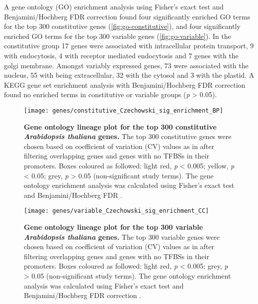 \documentclass[../main.tex]{subfiles}
\begin{document}
A gene ontology (GO) enrichment analysis using Fisher's exact test \autocite{fisherInterpretationContingencyTables1922} and Benjamini/Hochberg FDR correction \autocite{benjaminiControllingFalseDiscovery1995} found four significantly enriched GO terms for the top 300 constitutive genes (\autoref{fig:go-constitutive}), and four significantly enriched GO terms for the top 300 variable genes (\autoref{fig:go-variable}).
In the constitutive group 17 genes were associated with intracellular protein transport, 9 with endocytosis, 4 with receptor mediated endocytosis and 7 genes with the golgi membrane.
Amongst variably expressed genes, 73 were associated with the nucleus, 55 with being extracellular, 32 with the cytosol and 3 with the plastid.
A KEGG gene set enrichment analysis with Benjamini/Hochberg FDR correction found no enriched terms in constitutive or variable groups (\textit{p} \textgreater{} 0.05).

\begin{figure}[hbt!]
	\begin{center}
		\capstart
		\texttt{[image: genes/constitutive\_Czechowski\_sig\_enrichment\_BP]}
		\caption{
			\textbf{Gene ontology lineage plot for the top 300 constitutive \textit{Arabidopsis thaliana} genes.}
			The top 300 constitutive genes were chosen based on coefficient of variation (CV) values as in \textcite{czechowskiGenomeWideIdentificationTesting2005} after filtering overlapping genes and genes with no TFBSs in their promoters.
			Boxes coloured as followed: light red, \textit{p} \textless{} 0.005; yellow, \textit{p} \textless{} 0.05; grey, \textit{p} \textgreater{} 0.05 (non-significant study terms).
			The gene ontology enrichment analysis was calculated using Fisher's exact test \autocite{fisherInterpretationContingencyTables1922} and Benjamini/Hochberg FDR \autocite{benjaminiControllingFalseDiscovery1995}.
			\label{fig:go-constitutive}
		}
		
	\end{center}
\end{figure}

\begin{figure}[hbt!]
	\begin{center}
		\capstart
		\texttt{[image: genes/variable\_Czechowski\_sig\_enrichment\_CC]}
		\caption{
			\textbf{Gene ontology lineage plot for the top 300 variable \textit{Arabidopsis thaliana} genes.}
			The top 300 variable genes were chosen based on coefficient of variation (CV) values as in \textcite{czechowskiGenomeWideIdentificationTesting2005} after filtering overlapping genes and genes with no TFBSs in their promoters.
			Boxes coloured as followed: light red, \textit{p} \textless{} 0.005; grey, \textit{p} \textgreater{} 0.05 (non-significant study terms).
			The gene ontology enrichment analysis was calculated using Fisher's exact test \autocite{fisherInterpretationContingencyTables1922} and Benjamini/Hochberg FDR correction \autocite{benjaminiControllingFalseDiscovery1995}.
			\label{fig:go-variable}
		}
		
	\end{center}
\end{figure}
\end{document}
